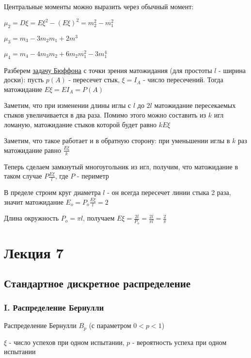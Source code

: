 \documentclass[12pt]{article}
\begin{document}
    \Nota Центральные моменты можно выразить через обычный момент:

    $\mu_2 = D\xi = E\xi^2 - (E\xi)^2 = m_2^2 - m_1^2$

    $\mu_3 = m_3 - 3m_2 m_1 + 2m^3$

    $\mu_4 = m_4 - 4m_3 m_2 + 6m_2 m_1^2 - 3m_1^4$

    \Ex Разберем \hyperlink{buffonsproblem}{задачу Бюффона} с точки зрения матожидания (для простоты $l$ - ширина доски): пусть $p(A)$ - пересечет стык,
    $\xi = I_A$ - число пересечений. Тогда матожидание $E\xi = E I_A = P(A)$

    Заметим, что при изменении длины иглы с $l$ до $2l$ матожидание пересекаемых стыков увеличивается
    в два раза. Помимо этого можно составить из $k$ игл ломаную, матожидание стыков которой будет равно $kE\xi$

    Заметим, что такое работает и в обратную сторону: при уменьшении иглы в $k$ раз матожидание равно $\frac{E\xi}{k}$

    Теперь сделаем замкнутый многоугольник из игл, получим, что матожидание в таком случае $P\frac{E\xi}{l}$, где $P$ - периметр

    В пределе строим круг диаметра $l$ - он всегда пересечет линии стыка 2 раза, значит матожидание $E_o = P_o\frac{E\xi}{l} = 2$

    Длина окружность $P_o = \pi l$, получаем $E\xi = \frac{2l}{P_o} = \frac{2l}{\pi l} = \frac{2}{\pi}$


    \section{Лекция 7}

    \subsection{Стандартное дискретное распределение}

    \subsubsection{I. Распределение Бернулли}

    \hypertarget{bernoullidistribution}{}

    Распределение Бернулли $B_p$ (с параметром $0 < p < 1$)

    $\xi$ - число успехов при одном испытании, $p$ - вероятность успеха при одном испытании
    
\end{document}
